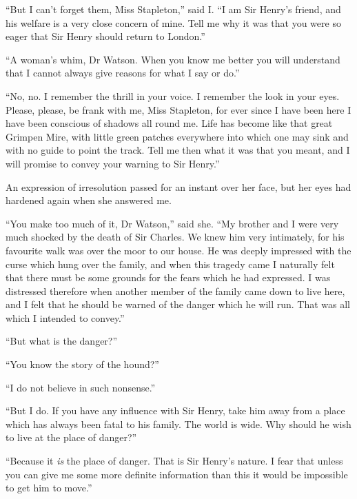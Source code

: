 \documentclass[paper=a5,BCOR=7mm,twoside,DIV=calc,12pt,usegeometry,openany,chapterprefix,endperiod,headings=big]{scrbook} %
\begin{document}
\enquote{But I can't forget them, Miss Stapleton,} said I. \enquote{I am Sir Hen\-ry's friend, and his welfare is a very close concern of mine. Tell me why it was that you were so eager that Sir Henry should return to London.}

\enquote{A woman's whim, Dr Watson. When you know me better you will understand that I cannot always give reasons for what I say or do.}

\enquote{No, no. I remember the thrill in your voice. I remember the look in your eyes. Please, please, be frank with me, Miss Stapleton, for ever since I have been here I have been conscious of shadows all round me. Life has become like that great Grimpen Mire, with little green patches everywhere into which one may sink and with no guide to point the track. Tell me then what it was that you meant, and I will promise to convey your warning to Sir Henry.}

An expression of irresolution passed for an instant over her face, but her eyes had hardened again when she answered me.

\enquote{You make too much of it, Dr Watson,} said she. \enquote{My brother and I were very much shocked by the death of Sir Charles. We knew him very intimately, for his favourite walk was over the moor to our house. He was deeply impressed with the curse which hung over the family, and when this tragedy came I naturally felt that there must be some grounds for the fears which he had expressed. I was distressed therefore when another member of the family came down to live here, and I felt that he should be warned of the danger which he will run. That was all which I intended to convey.}

\enquote{But what is the danger?}

\enquote{You know the story of the hound?}


\enquote{I do not believe in such nonsense.}

\enquote{But I do. If you have any influence with Sir Henry, take him away from a place which has always been fatal to his family. The world is wide. Why should he wish to live at the place of danger?}

\enquote{Because it \textit{is} the place of danger. That is Sir Henry's nature. I fear that unless you can give me some more definite information than this it would be impossible to get him to move.}
\end{document}
